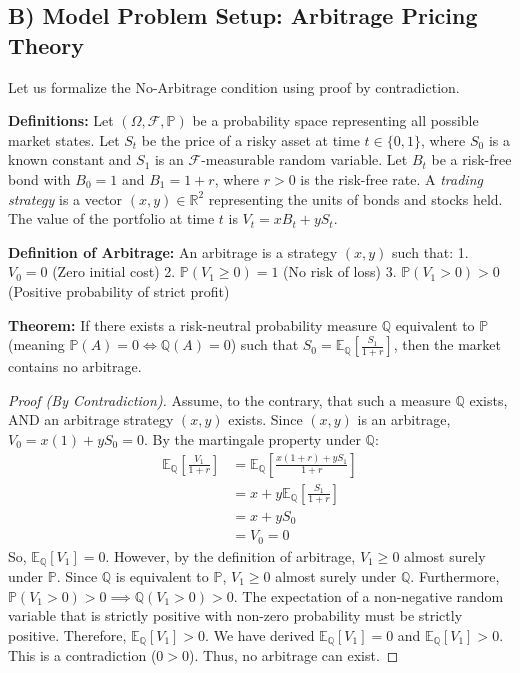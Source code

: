 \documentclass[11pt, letterpaper]{article}
\theoremstyle{remark}
\newcommand{\R}{\mathbb{R}}
\newcommand{\E}{\mathbb{E}}
\newcommand{\Prob}{\mathbb{P}}
\newcommand{\F}{\mathcal{F}}
\begin{document}
\subsection{B) Model Problem Setup: Arbitrage Pricing Theory}
Let us formalize the No-Arbitrage condition using proof by contradiction.

\textbf{Definitions:}
Let $(\Omega, \F, \Prob)$ be a probability space representing all possible market states.
Let $S_t$ be the price of a risky asset at time $t \in \{0, 1\}$, where $S_0$ is a known constant and $S_1$ is an $\F$-measurable random variable.
Let $B_t$ be a risk-free bond with $B_0 = 1$ and $B_1 = 1 + r$, where $r > 0$ is the risk-free rate.
A \textit{trading strategy} is a vector $(x, y) \in \R^2$ representing the units of bonds and stocks held.
The value of the portfolio at time $t$ is $V_t = xB_t + yS_t$.

\textbf{Definition of Arbitrage:}
An arbitrage is a strategy $(x, y)$ such that:
1. $V_0 = 0$ (Zero initial cost)
2. $\Prob(V_1 \ge 0) = 1$ (No risk of loss)
3. $\Prob(V_1 > 0) > 0$ (Positive probability of strict profit)

\textbf{Theorem:} If there exists a risk-neutral probability measure $\mathbb{Q}$ equivalent to $\Prob$ (meaning $\Prob(A)=0 \iff \mathbb{Q}(A)=0$) such that $S_0 = \E_{\mathbb{Q}}\left[\frac{S_1}{1+r}\right]$, then the market contains no arbitrage.

\begin{proof}[Proof (By Contradiction)]
Assume, to the contrary, that such a measure $\mathbb{Q}$ exists, AND an arbitrage strategy $(x, y)$ exists.
Since $(x, y)$ is an arbitrage, $V_0 = x(1) + yS_0 = 0$.
By the martingale property under $\mathbb{Q}$:
\begin{align*}
\E_{\mathbb{Q}}\left[\frac{V_1}{1+r}\right] &= \E_{\mathbb{Q}}\left[\frac{x(1+r) + yS_1}{1+r}\right] \\
&= x + y\E_{\mathbb{Q}}\left[\frac{S_1}{1+r}\right] \\
&= x + yS_0 \\
&= V_0 = 0
\end{align*}
So, $\E_{\mathbb{Q}}[V_1] = 0$.
However, by the definition of arbitrage, $V_1 \ge 0$ almost surely under $\Prob$. Since $\mathbb{Q}$ is equivalent to $\Prob$, $V_1 \ge 0$ almost surely under $\mathbb{Q}$.
Furthermore, $\Prob(V_1 > 0) > 0 \implies \mathbb{Q}(V_1 > 0) > 0$.
The expectation of a non-negative random variable that is strictly positive with non-zero probability must be strictly positive.
Therefore, $\E_{\mathbb{Q}}[V_1] > 0$.
We have derived $\E_{\mathbb{Q}}[V_1] = 0$ and $\E_{\mathbb{Q}}[V_1] > 0$. This is a contradiction ($0 > 0$).
Thus, no arbitrage can exist.
\end{proof}
\end{document}
